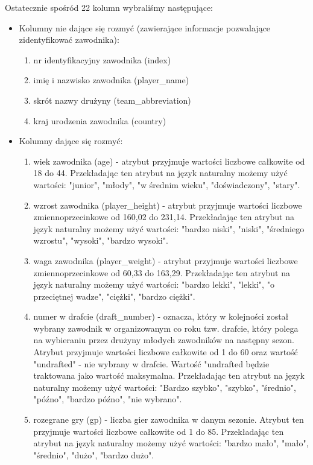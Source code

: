 \documentclass{classrep}
\begin{document}
Ostatecznie spośród 22 kolumn wybraliśmy następujące:
\begin{itemize}
    \item Kolumny nie dające się rozmyć (zawierające informacje pozwalające zidentyfikować zawodnika):
    \begin{enumerate}
        \item nr identyfikacyjny zawodnika (index)
        \item imię i nazwisko zawodnika (player\_name)
        \item skrót nazwy drużyny (team\_abbreviation)
        \item kraj urodzenia zawodnika (country)
    \end{enumerate}
    \item Kolumny dające się rozmyć:
    \begin{enumerate}
        \item wiek zawodnika (age) - atrybut przyjmuje wartości liczbowe całkowite od 18 do 44. Przekładając ten atrybut na język naturalny możemy użyć wartości: "junior", "młody", "w średnim wieku", "doświadczony", "stary". 
        \item wzrost zawodnika (player\_height) - atrybut przyjmuje wartości liczbowe zmiennoprzecinkowe od 160,02 do 231,14. Przekładając ten atrybut na język naturalny możemy użyć wartości: "bardzo niski", "niski", "średniego wzrostu", "wysoki", "bardzo wysoki".
        \item waga zawodnika (player\_weight) - atrybut przyjmuje wartości liczbowe zmiennoprzecinkowe od 60,33 do 163,29. Przekładając ten atrybut na język naturalny możemy użyć wartości: "bardzo lekki", "lekki", "o przeciętnej wadze", "ciężki", "bardzo ciężki".
        \item numer w drafcie (draft\_number) - oznacza, który w kolejności został wybrany zawodnik w organizowanym co roku tzw. drafcie, który polega na wybieraniu przez drużyny młodych zawodników na następny sezon. Atrybut przyjmuje wartości liczbowe całkowite od 1 do 60 oraz wartość "undrafted" - nie wybrany w drafcie. Wartość "undrafted będzie traktowana jako wartość maksymalna. Przekładając ten atrybut na język naturalny możemy użyć wartości: "Bardzo szybko", "szybko", "średnio", "późno", "bardzo późno", "nie wybrano".
        \item rozegrane gry (gp) - liczba gier zawodnika w danym sezonie. Atrybut ten przyjmuje wartości liczbowe całkowite od 1 do 85.  Przekładając ten atrybut na język naturalny możemy użyć wartości: "bardzo mało", "mało", "średnio", "dużo", "bardzo dużo".

\end{enumerate}
\end{itemize}
\end{document}
